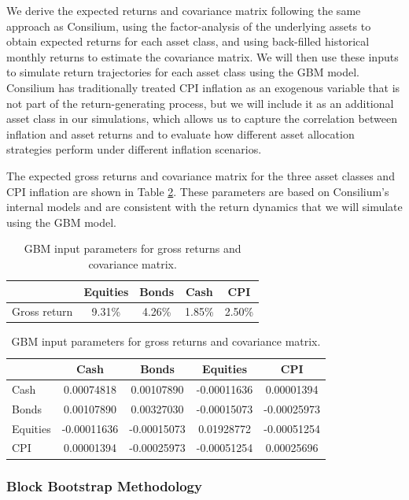 \documentclass[11pt]{article}
\begin{document}
We derive the expected returns and covariance matrix following the same approach as Consilium, using the factor-analysis of the underlying assets to obtain expected returns for each asset class, and using back-filled historical monthly returns to estimate the covariance matrix. We will then use these inputs to simulate return trajectories for each asset class using the GBM model. Consilium has traditionally treated CPI inflation as an exogenous variable that is not part of the return-generating process, but we will include it as an additional asset class in our simulations, which allows us to capture the correlation between inflation and asset returns and to evaluate how different asset allocation strategies perform under different inflation scenarios.

The expected gross returns and covariance matrix for the three asset classes and CPI inflation are shown in Table \ref{tab:gbm_parameters}. These parameters are based on Consilium's internal models and are consistent with the return dynamics that we will simulate using the GBM model.

\begin{table}[h!]
\centering
\caption{GBM input parameters for gross returns and covariance matrix.}
\label{tab:gbm_parameters}
\begin{tabular}{lcccc}
\toprule
 & Equities & Bonds & Cash & CPI \\
\midrule
Gross return & 9.31\% & 4.26\% & 1.85\% & 2.50\% \\
\bottomrule
\end{tabular}

\vspace{0.75em}

\small
\begin{tabular}{lcccc}
\toprule
 & Cash & Bonds & Equities & CPI \\
\midrule
Cash & 0.00074818 & 0.00107890 & -0.00011636 & 0.00001394 \\
Bonds & 0.00107890 & 0.00327030 & -0.00015073 & -0.00025973 \\
Equities & -0.00011636 & -0.00015073 & 0.01928772 & -0.00051254 \\
CPI & 0.00001394 & -0.00025973 & -0.00051254 & 0.00025696 \\
\bottomrule
\end{tabular}
\normalsize
\end{table}


\subsubsection{Block Bootstrap Methodology}
\end{document}
